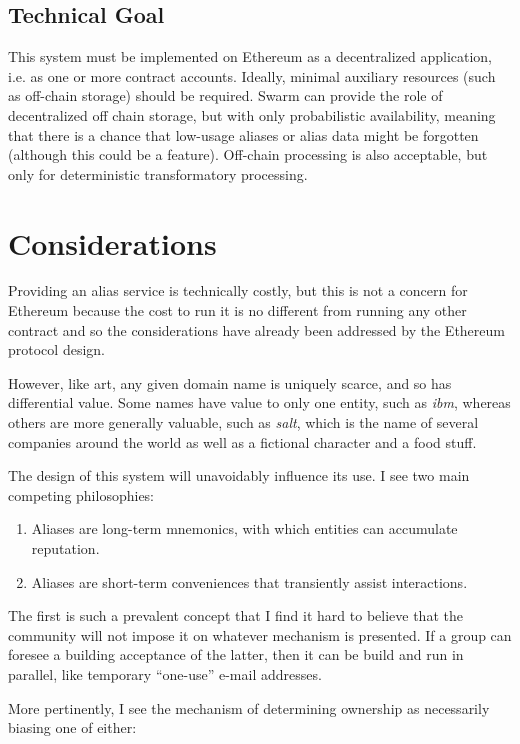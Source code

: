 \documentclass[10pt,a4paper]{article}
\begin{document}
\subsection*{Technical Goal}
This system must be implemented on Ethereum as a decentralized application, i.e. as one or more contract accounts. Ideally, minimal auxiliary resources (such as off-chain storage) should be required. Swarm can provide the role of decentralized off chain storage, but with only probabilistic availability, meaning that there is a chance that low-usage aliases or alias data might be forgotten (although this could be a feature). Off-chain processing is also acceptable, but only for deterministic transformatory processing.

\section*{Considerations}

Providing an alias service is technically costly, but this is not a concern for Ethereum because the cost to run it is no different from running any other contract and so the considerations have already been addressed by the Ethereum protocol design.

However, like art, any given domain name is uniquely scarce, and so has differential value. Some names have value to only one entity, such as {\it ibm}, whereas others are more generally valuable, such as {\it salt}, which is the name of several companies around the world as well as a fictional character and a food stuff.

The design of this system will unavoidably influence its use. I see two main competing philosophies:

\begin{enumerate}
\item Aliases are long-term mnemonics, with which entities can accumulate reputation.
\item Aliases are short-term conveniences that transiently assist interactions.
\end{enumerate}

The first is such a prevalent concept that I find it hard to believe that the community will not impose it on whatever mechanism is presented. If a group can foresee a building acceptance of the latter, then it can be build and run in parallel, like temporary ``one-use'' e-mail addresses.

More pertinently, I see the mechanism of determining ownership as necessarily biasing one of either:
\end{document}
